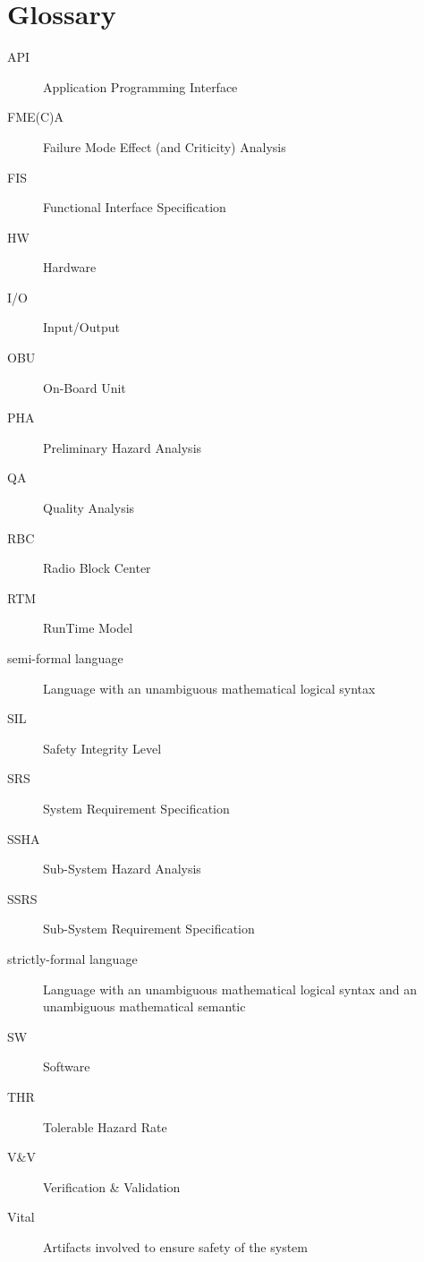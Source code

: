\section{Glossary}
\begin{description}
\item[API] Application Programming Interface
\item[FME(C)A] Failure Mode Effect (and Criticity) Analysis
\item[FIS] Functional Interface Specification
\item[HW] Hardware
\item[I/O] Input/Output
\item[OBU] On-Board Unit
\item[PHA] Preliminary Hazard Analysis
\item[QA] Quality Analysis
\item[RBC] Radio Block Center
\item[RTM] RunTime Model
\item[semi-formal language] Language with an unambiguous mathematical logical syntax
\item[SIL] Safety Integrity Level
\item[SRS] System Requirement Specification
\item[SSHA] Sub-System Hazard Analysis
\item[SSRS] Sub-System Requirement Specification
\item[strictly-formal language] Language with an unambiguous mathematical logical syntax and an unambiguous mathematical semantic
\item[SW] Software
\item[THR] Tolerable Hazard Rate
\item[V\&V] Verification \& Validation
\item[Vital]	Artifacts involved to ensure safety of the system
\end{description}
